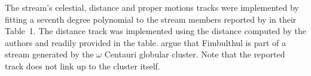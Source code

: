 The stream's celestial, distance and proper motions tracks were implemented by fitting a seventh degree polynomial to the stream members reported by \citet{Ibata2021} in their Table~1. The distance track was implemented using the distance computed by the authors and readily provided in the table. \citet{Ibata2019_OCen} argue that Fimbulthul is part of a stream generated by the $\omega$ Centauri globular cluster. Note that the reported track does not link up to the cluster itself.
